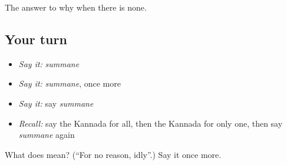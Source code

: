 \begin{grammarlens}[title={What you've built}]
The answer to why when there is none.
\end{grammarlens}

\subsection*{Your turn}
\begin{itemize}
\raggedright
  \item \emph{Say it:} \emph{summane}
  \item \emph{Say it:} \emph{summane}, once more
  \item \emph{Say it:} say \emph{summane}
  \item \emph{Recall:} say the Kannada for all, then the Kannada for only one, then say \emph{summane} again
\end{itemize}

\begin{tcolorbox}[breakable,colback=teal!4,colframe=teal!35!black,title={Before you move on}]
What does  mean? (\textquotedblleft{}For no reason, idly\textquotedblright{}.) Say it once more.
\end{tcolorbox}
